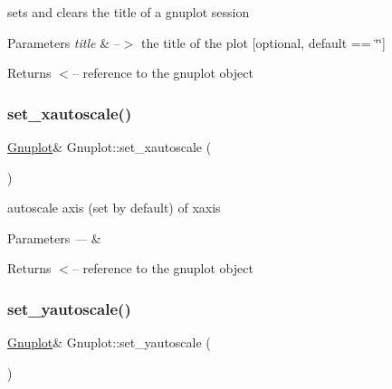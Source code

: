 sets and clears the title of a gnuplot session 


\begin{DoxyParams}{Parameters}
{\em title} & --$>$ the title of the plot \mbox{[}optional, default == \char`\"{}\char`\"{}\mbox{]}\\
\hline
\end{DoxyParams}
\begin{DoxyReturn}{Returns}
$<$-- reference to the gnuplot object 
\end{DoxyReturn}
\mbox{\label{class_gnuplot_a11a62a04c203f01607c3c21a727e318d}} 
\subsubsection{\texorpdfstring{set\+\_\+xautoscale()}{set\_xautoscale()}}
{\footnotesize\ttfamily \hyperlink{class_gnuplot}{Gnuplot}\& Gnuplot\+::set\+\_\+xautoscale (\begin{DoxyParamCaption}{ }\end{DoxyParamCaption})\hspace{0.3cm}{\ttfamily [inline]}}

autoscale axis (set by default) of xaxis


\begin{DoxyParams}{Parameters}
{\em ---} & \\
\hline
\end{DoxyParams}
\begin{DoxyReturn}{Returns}
$<$-- reference to the gnuplot object 
\end{DoxyReturn}
\mbox{\label{class_gnuplot_a5b9e1a4e68f94d418a8e9194f168b448}} 
\subsubsection{\texorpdfstring{set\+\_\+yautoscale()}{set\_yautoscale()}}
{\footnotesize\ttfamily \hyperlink{class_gnuplot}{Gnuplot}\& Gnuplot\+::set\+\_\+yautoscale (\begin{DoxyParamCaption}{ }\end{DoxyParamCaption})\hspace{0.3cm}{\ttfamily [inline]}}

